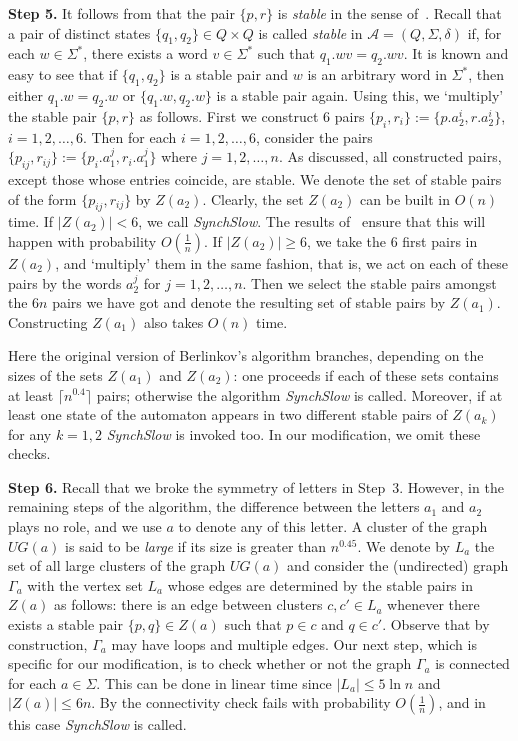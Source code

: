 \documentclass{jalc}
\begin{document}
\textbf{Step 5.} It follows from \cite[Theorem~3]{Berlinkov:preprint} that the pair $\{p,r\}$ is \emph{stable} in the sense of~\cite{CKK:2002}. Recall that a pair of distinct states $\{q_1,q_2\}\in Q\times Q$ is called \emph{stable} in  $\mathcal{A}=(Q, \Sigma, \delta)$ if, for each $w \in \Sigma^*$, there exists a word $v \in \Sigma^*$ such that $q_1.wv = q_2.wv$. It is known and easy to see that if $\{q_1,q_2\}$ is a stable pair and $w$ is an arbitrary word in $\Sigma^*$, then either $q_1.w = q_2.w$ or $\{q_1.w,q_2.w\}$ is a stable pair again. Using this, we `multiply' the stable pair $\{p,r\}$ as follows. First we construct 6 pairs $\{p_i,r_i\}:=\{p.a_2^i, r.a_2^i\}$, $i=1, 2, \dots, 6$.  Then for each $i=1,2,\dots,6$, consider the pairs $\{p_{ij},r_{ij}\}:=\{p_i.a_1^j, r_i.a_1^j\}$ where $j=1,2,\dots, n$. As discussed, all constructed pairs, except those whose entries coincide, are stable. We denote the set of stable pairs of the form $\{p_{ij},r_{ij}\}$ by $Z(a_2)$. Clearly, the set $Z(a_2)$ can be built in $O(n)$ time. If $|Z(a_2)|<6$, we call \emph{SynchSlow}. The results of~\cite[Lemmas~7 and~8]{Berlinkov:preprint} ensure that this will happen with probability $O(\frac1n)$. If $|Z(a_2)|\ge6$, we take the 6 first pairs in $Z(a_2)$, and `multiply' them in the same fashion, that is, we act on each of these pairs by the words $a_2^j$ for $j=1,2,\dots,n$.  Then we select the stable pairs amongst the $6n$ pairs we have got and denote the resulting set of stable pairs by $Z(a_1)$. Constructing $Z(a_1)$ also takes $O(n)$ time.

Here the original version of Berlinkov's algorithm branches, depending on the sizes of the sets $Z(a_1)$ and $Z(a_2)$: one proceeds if each of these sets contains at least $\lceil n^{0.4} \rceil$ pairs; otherwise the algorithm \emph{SynchSlow} is called. Moreover, if at least one state of the automaton appears in two different stable pairs of $Z(a_k)$ for any $k=1,2$ \emph{SynchSlow} is invoked too. In our modification, we omit these checks.

\smallskip

\textbf{Step 6.} Recall that we broke the symmetry of letters in Step~3. However, in the remaining steps of the algorithm, the difference between the letters $a_1$ and $a_2$ plays no role, and we use $a$ to denote any of this letter. A cluster of the graph $U\!G(a)$ is said to be \emph{large} if its size is greater than $n^{0.45}$. We denote by $L_a$ the set of all large clusters of the graph $U\!G(a)$ and consider the (undirected) graph $\Gamma_a$ with the vertex set $L_a$ whose edges are determined by the stable pairs in $Z(a)$ as follows: there is an edge between clusters $c,c'\in L_a$ whenever there exists a stable pair $\{p, q\} \in Z(a)$ such that $p \in c$ and $q\in c'$. Observe that by construction, $\Gamma_a$ may have loops and multiple edges. Our next step, which is specific for our modification, is to check whether or not the graph $\Gamma_a$ is connected for each $a\in\Sigma$. This can be done in linear time since $|L_a|\le 5\ln n$ and $|Z(a)|\le 6n$. By \cite[Lemma~3]{Berlinkov:preprint} the connectivity check fails with probability $O(\frac1n)$, and in this case \emph{SynchSlow} is called.
\end{document}
